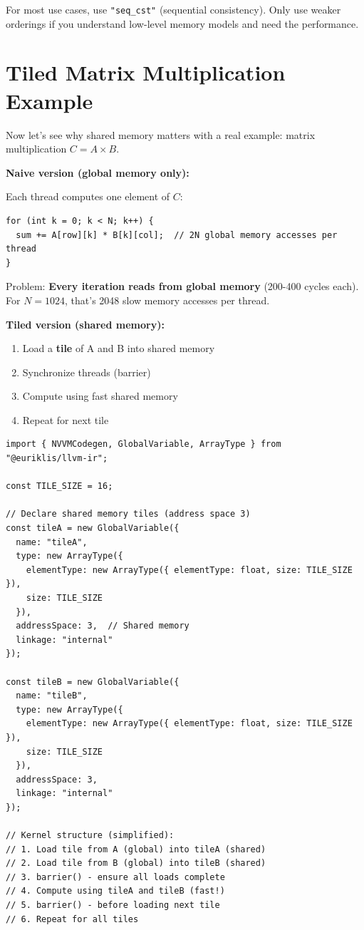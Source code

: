 \documentclass[11pt,oneside]{book}
\begin{document}
For most use cases, use \texttt{"seq\_cst"} (sequential consistency). Only use weaker orderings if you understand low-level memory models and need the performance.

\section{Tiled Matrix Multiplication Example}

Now let's see why shared memory matters with a real example: matrix multiplication \(C = A \times B\).

\textbf{Naive version (global memory only):}

Each thread computes one element of \(C\):
\begin{lstlisting}[style=ts]
for (int k = 0; k < N; k++) {
  sum += A[row][k] * B[k][col];  // 2N global memory accesses per thread
}
\end{lstlisting}

Problem: \textbf{Every iteration reads from global memory} (200-400 cycles each). For \(N=1024\), that's 2048 slow memory accesses per thread.

\textbf{Tiled version (shared memory):}

\begin{enumerate}[noitemsep]
  \item Load a \textbf{tile} of A and B into shared memory
  \item Synchronize threads (barrier)
  \item Compute using fast shared memory
  \item Repeat for next tile
\end{enumerate}

\begin{lstlisting}[style=ts]
import { NVVMCodegen, GlobalVariable, ArrayType } from "@euriklis/llvm-ir";

const TILE_SIZE = 16;

// Declare shared memory tiles (address space 3)
const tileA = new GlobalVariable({
  name: "tileA",
  type: new ArrayType({
    elementType: new ArrayType({ elementType: float, size: TILE_SIZE }),
    size: TILE_SIZE
  }),
  addressSpace: 3,  // Shared memory
  linkage: "internal"
});

const tileB = new GlobalVariable({
  name: "tileB",
  type: new ArrayType({
    elementType: new ArrayType({ elementType: float, size: TILE_SIZE }),
    size: TILE_SIZE
  }),
  addressSpace: 3,
  linkage: "internal"
});

// Kernel structure (simplified):
// 1. Load tile from A (global) into tileA (shared)
// 2. Load tile from B (global) into tileB (shared)
// 3. barrier() - ensure all loads complete
// 4. Compute using tileA and tileB (fast!)
// 5. barrier() - before loading next tile
// 6. Repeat for all tiles
\end{lstlisting}
\end{document}

